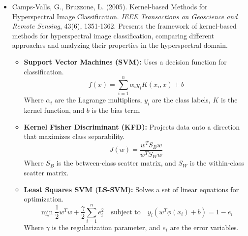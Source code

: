 \documentclass[10pt,svgnames,fragile]{beamer}
\begin{document}
\begin{frame}{}
\tiny
\begin{itemize}

    \item Camps-Valls, G., Bruzzone, L. (2005). Kernel-based Methods for Hyperspectral Image Classification. \textit{IEEE Transactions on Geoscience and Remote Sensing}, 43(6), 1351-1362. \href{https://ieeexplore.ieee.org/document/1421797}{\color{blue}{DOI: 10.1109/TGRS.2005.846154}}
    {\color{gray}Presents the framework of kernel-based methods for hyperspectral image classification, comparing different approaches and analyzing their properties in the hyperspectral domain.}
    \begin{itemize} \tiny
    \item \textbf{Support Vector Machines (SVM):} Uses a decision function for classification.
    \[
    f(x) = \sum_{i=1}^{n} \alpha_i y_i K(x_i, x) + b
    \]
    Where \( \alpha_i \) are the Lagrange multipliers, \( y_i \) are the class labels, \( K \) is the kernel function, and \( b \) is the bias term.
    \item \textbf{Kernel Fisher Discriminant (KFD):} Projects data onto a direction that maximizes class separability.
    \[
    J(w) = \frac{w^T S_B w}{w^T S_W w}
    \]
    Where \( S_B \) is the between-class scatter matrix, and \( S_W \) is the within-class scatter matrix.
    \item \textbf{Least Squares SVM (LS-SVM):} Solves a set of linear equations for optimization.
    \[
    \min_w \frac{1}{2} w^T w + \frac{\gamma}{2} \sum_{i=1}^{n} e_i^2 \quad \text{subject to} \quad y_i (w^T \phi(x_i) + b) = 1 - e_i
    \]
    Where \( \gamma \) is the regularization parameter, and \( e_i \) are the error variables.
\end{itemize}
    
\end{itemize}
\end{frame}
\end{document}
